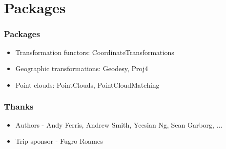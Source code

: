 \documentclass{beamer}
\newcommand{\vf}[1]{\vskip0pt plus #1}
\begin{document}



\section{Packages}

\begin{frame}
  \frametitle{Packages}
  \begin{itemize}
    \item
      Transformation functors: CoordinateTransformations
    \item
      Geographic transformations: Geodesy, Proj4
    \item
      Point clouds: PointClouds, PointCloudMatching
  \end{itemize}
\end{frame}

\begin{frame}
  \frametitle{Thanks}
  \begin{itemize}
    \item
      Authors - Andy Ferris, Andrew Smith, Yeesian Ng, Sean Garborg, ...
    \item
      Trip sponsor - Fugro Roames
  \end{itemize}
\end{frame}
\end{document}

